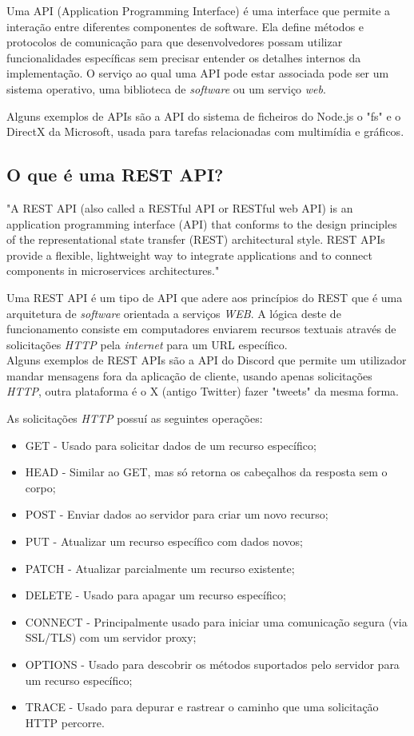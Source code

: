 Uma API (Application Programming Interface) é uma interface que permite a interação entre diferentes componentes de software. 
Ela define métodos e protocolos de comunicação para que desenvolvedores possam utilizar 
funcionalidades específicas sem precisar entender os detalhes internos da implementação.
O serviço ao qual uma API pode estar associada pode ser um sistema operativo, uma biblioteca
de \textit{software} ou um serviço \textit{web}.

Alguns exemplos de APIs são a API do sistema de ficheiros do Node.js o "fs" e o DirectX 
da Microsoft, usada para tarefas relacionadas com multimídia e gráficos.

\subsection{O que é uma REST API?}


"A REST API (also called a RESTful API or RESTful web API) is an application 
programming interface (API) that conforms to the design principles of the representational
state transfer (REST) architectural style. REST APIs provide a flexible, lightweight way 
to integrate applications and to connect components in microservices architectures." \cite{ibmrestapi}



Uma REST API é um tipo de API que adere aos princípios do REST que é uma arquitetura
de \textit{software} orientada a serviços \textit{WEB}.
A lógica deste de funcionamento consiste em computadores enviarem recursos textuais através
de solicitações \textit{HTTP} pela \textit{internet} para um URL específico. \\

Alguns exemplos de REST APIs são a API do Discord que permite um utilizador mandar mensagens fora
da aplicação de cliente, usando apenas solicitações \textit{HTTP}, outra plataforma é 
o X (antigo Twitter) fazer "tweets" da mesma forma.


As solicitações \textit{HTTP} possuí as seguintes operações:
\begin{itemize}
    \item GET - Usado para solicitar dados de um recurso específico;
    \item HEAD - Similar ao GET, mas só retorna os cabeçalhos da resposta sem o corpo;
    \item POST - Enviar dados ao servidor para criar um novo recurso; 
    \item PUT - Atualizar um recurso específico com dados novos;
    \item PATCH - Atualizar parcialmente um recurso existente; 
    \item DELETE - Usado para apagar um recurso específico; 
    \item CONNECT - Principalmente usado para iniciar uma comunicação
    segura (via SSL/TLS) com um servidor proxy; 
    \item OPTIONS - Usado para descobrir os métodos suportados pelo servidor para um recurso específico;
    \item TRACE - Usado para depurar e rastrear o caminho que uma solicitação HTTP percorre.
\end{itemize}


